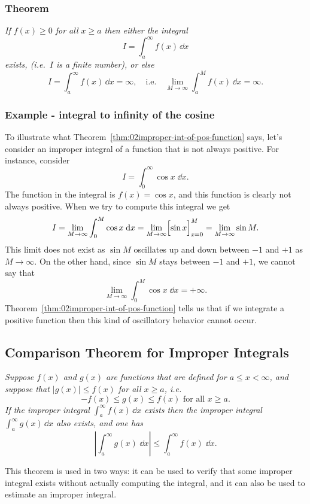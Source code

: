 \subsubsection{Theorem}\itshape%
\label{thm:02improper-int-of-pos-function}%
If $f(x)\geq 0$ for all $x\geq a$ then either the integral
\[
I = \int_a^\infty f(x) \, \dd x
\]
exists, (i.e.~$I$ is a finite number), or else
\[
I = \int_a^\infty f(x) \, \dd x = \infty, \quad\text{i.e.}\quad
\lim_{M\to\infty} \int_a^M f(x) \, \dd x =\infty.
\]\upshape

\subsubsection{Example - integral to infinity of the cosine}
\label{sec:int-to-infty-of-cos}
To illustrate what Theorem~\ref{thm:02improper-int-of-pos-function}
says, let's consider an improper integral of a function that is not
always positive. For instance, consider
\[
I = \int_0^\infty \cos x \;\dd x.
\]
The function in the integral is $f(x) = \cos x$, and this function is
clearly not always positive.  When we try to compute this integral we
get
\[
I = \lim_{M\to\infty} \int_0^M \cos x \;\mathrm{d} x =\lim_{M\to\infty}
\Bigl[\sin x\Bigr]_{x=0}^M =\lim_{M\to\infty} \sin M.
\]
This limit does not exist as $\sin M$ oscillates up and down between
$-1$ and $+1$ as $M\to\infty$.  On the other hand, since $\sin M$
stays between $-1$ and $+1$, we cannot say that
\[
\lim_{M\to\infty} \int_0^M \cos x \;\dd x = +\infty.
\]
Theorem~\ref{thm:02improper-int-of-pos-function} tells us that if we
integrate a positive function then this kind of oscillatory behavior
cannot occur.




\subsection{Comparison Theorem for Improper Integrals} %
\label{sec:02comparison-thm}\itshape
Suppose $f(x)$ and $g(x)$ are functions that are defined for $a\leq x
<\infty$, and suppose that $|g(x)|\leq f(x)$ for all $x\geq a$, i.e.
\[
-f(x) \leq g(x) \leq f(x) \text{ for all }x\geq a.
\]
If the improper integral $\int_a^\infty f(x)\,\dd x$ exists then the
improper integral $\int_a^\infty g(x)\,\dd x$ also exists, and one has
\[
\left|\int_a^\infty g(x)\;\dd x\right| \leq \int_a^\infty f(x)\;\dd x.
\]\upshape%

This theorem is used in two ways: it can be used to verify that some
improper integral exists without actually computing the integral, and
it can also be used to estimate an improper integral.

